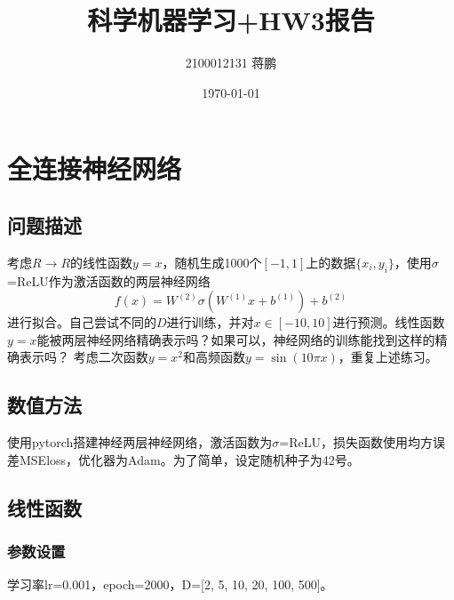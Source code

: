 \documentclass[11pt,a4 paper,one side]{article}
\title{科学机器学习+HW3报告}
\author{2100012131 蒋鹏}
\date{\today}
\begin{document}
\maketitle
\tableofcontents
\section{全连接神经网络}
\subsection{问题描述}
考虑$R\rightarrow R$的线性函数$y=x$，随机生成1000个$[-1,1]$上的数据$\{x_i,y_i\}$，使用$\sigma$=ReLU作为激活函数的两层神经网络
\begin{equation}
    f(x)=W^{(2)}\sigma (W^{(1)}x+b^{(1)})+b^{(2)}
\end{equation}
进行拟合。自己尝试不同的$D$进行训练，并对$x\in[-10,10]$进行预测。线性函数$y=x$能被两层神经网络精确表示吗？如果可以，神经网络的训练能找到这样的精确表示吗？
考虑二次函数$y=x^2$和高频函数$y=\sin(10\pi x)$，重复上述练习。
\subsection{数值方法}
使用pytorch搭建神经两层神经网络，激活函数为$\sigma$=ReLU，损失函数使用均方误差MSEloss，优化器为Adam。为了简单，设定随机种子为42号。
\subsection{线性函数}
\subsubsection{参数设置}
学习率lr=0.001，epoch=2000，D=[2, 5, 10, 20, 100, 500]。
\end{document}

